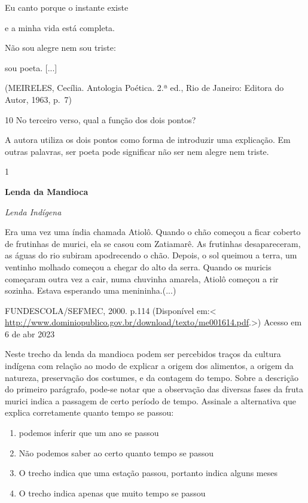 {Eu canto porque o instante existe

e a minha vida está completa.

Não sou alegre nem sou triste:

sou poeta. {[}...{]}

(MEIRELES, Cecília. Antologia Poética. 2.ª ed., Rio de Janeiro: Editora
do Autor, 1963, p.~7)

\num{10} No terceiro verso, qual a função dos dois pontos?

A autora utiliza os dois pontos como forma de introduzir uma explicação.
Em outras palavras, ser poeta pode significar não ser nem alegre nem
triste.


\num{1}

\textbf{Lenda da Mandioca}

\emph{Lenda Indígena}

Era uma vez uma índia chamada Atiolô. Quando o chão começou a ficar
coberto de frutinhas de murici, ela se casou com Zatiamarê. As frutinhas
desapareceram, as águas do rio subiram apodrecendo o chão. Depois, o sol
queimou a terra, um ventinho molhado começou a chegar do alto da serra.
Quando os muricis começaram outra vez a cair, numa chuvinha amarela,
Atiolô começou a rir sozinha. Estava esperando uma menininha.(...)

\begin{description}
\tightlist
\item[Alfabetização : livro do aluno / Ana Rosa Abreu ... {[}et al.{]}
Brasília]
FUNDESCOLA/SEFMEC, 2000. p.114 (Disponível em:\textless{}
\url{http://www.dominiopublico.gov.br/download/texto/me001614.pdf}.\textgreater)
Acesso em 6 de abr 2023
\end{description}

Neste trecho da lenda da mandioca podem ser percebidos traços da cultura
indígena com relação ao modo de explicar a origem dos alimentos, a
origem da natureza, preservação dos costumes, e da contagem do tempo.
Sobre a descrição do primeiro parágrafo, pode-se notar que a observação
das diversas fases da fruta murici indica a passagem de certo período de
tempo. Assinale a alternativa que explica corretamente quanto tempo se
passou:

\begin{enumerate}
\def\labelenumi{\alph{enumi})}
\item
  podemos inferir que um ano se passou
\item
  Não podemos saber ao certo quanto tempo se passou
\item
  O trecho indica que uma estação passou, portanto indica alguns meses
\item
  O trecho indica apenas que muito tempo se passou
\end{enumerate}

}
